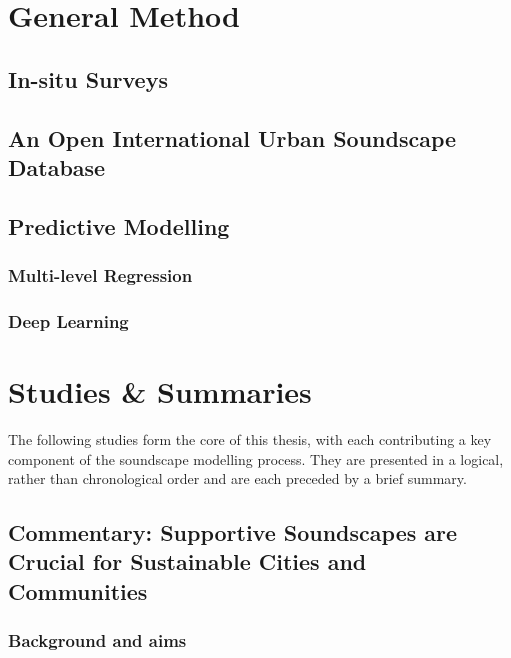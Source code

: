 \documentclass[twoside,fontsize=12pt,titlepage]{scrbook}
\begin{document}

 \chapter{General Method}

\section{In-situ Surveys}

\section{An Open International Urban Soundscape Database}

\section{Predictive Modelling}


 \subsection{Multi-level Regression}

 \subsection{Deep Learning}



       \chapter{Studies \& Summaries}

       The following studies form the core of this thesis, with each contributing a key component of the soundscape modelling process. They are presented in a logical, rather than chronological order and are each preceded by a brief summary.

       \newpage
\section{Commentary: Supportive Soundscapes are Crucial for Sustainable Cities and Communities}

 \subsection*{Background and aims}
\end{document}
